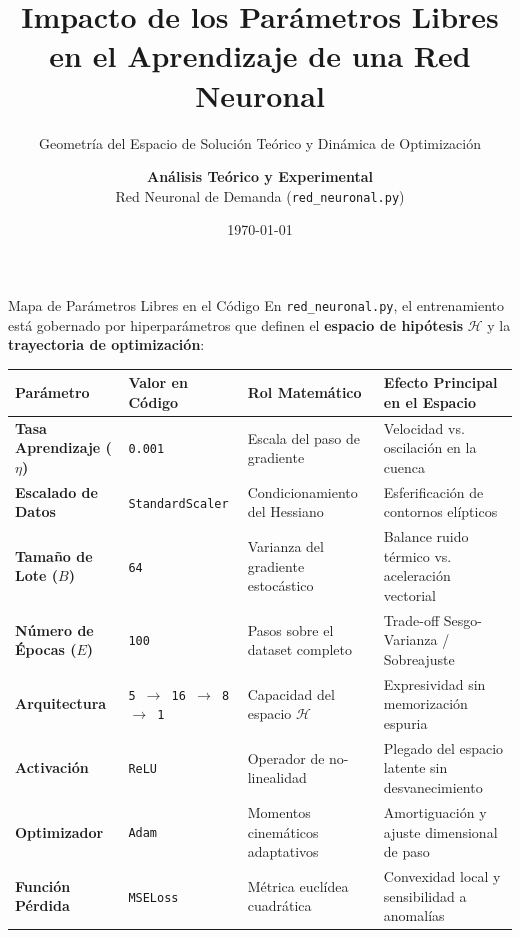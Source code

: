 \documentclass[10pt,aspectratio=169]{beamer}
\title{Impacto de los Parámetros Libres en el Aprendizaje de una Red Neuronal}
\subtitle{Geometría del Espacio de Solución Teórico y Dinámica de Optimización}
\author{\textbf{Análisis Teórico y Experimental} \\ Red Neuronal de Demanda (\texttt{red\_neuronal.py})}
\date{\today}
\institute{Deep Learning \& Optimización Matemática}
\begin{document}
\begin{frame}
  \titlepage
\end{frame}

\begin{frame}{Mapa de Parámetros Libres en el Código}
  En \texttt{red\_neuronal.py}, el entrenamiento está gobernado por hiperparámetros que definen el \textbf{espacio de hipótesis} $\mathcal{H}$ y la \textbf{trayectoria de optimización}:
  \vspace{0.15cm}

  \begin{center}
    \scriptsize
    \begin{tabular}{p{2.6cm} p{2.0cm} p{3.4cm} p{4.6cm}}
      \toprule
      \textbf{Parámetro} & \textbf{Valor en Código} & \textbf{Rol Matemático} & \textbf{Efecto Principal en el Espacio} \\
      \midrule
      \textbf{Tasa Aprendizaje ($\eta$)} & \texttt{0.001} & Escala del paso de gradiente & Velocidad vs. oscilación en la cuenca \\
      \textbf{Escalado de Datos} & \texttt{StandardScaler} & Condicionamiento del Hessiano & Esferificación de contornos elípticos \\
      \textbf{Tamaño de Lote ($B$)} & \texttt{64} & Varianza del gradiente estocástico & Balance ruido térmico vs. aceleración vectorial \\
      \textbf{Número de Épocas ($E$)} & \texttt{100} & Pasos sobre el dataset completo & Trade-off Sesgo-Varianza / Sobreajuste \\
      \textbf{Arquitectura} & \texttt{5 $\to$ 16 $\to$ 8 $\to$ 1} & Capacidad del espacio $\mathcal{H}$ & Expresividad sin memorización espuria \\
      \textbf{Activación} & \texttt{ReLU} & Operador de no-linealidad & Plegado del espacio latente sin desvanecimiento \\
      \textbf{Optimizador} & \texttt{Adam} & Momentos cinemáticos adaptativos & Amortiguación y ajuste dimensional de paso \\
      \textbf{Función Pérdida} & \texttt{MSELoss} & Métrica euclídea cuadrática & Convexidad local y sensibilidad a anomalías \\
      \bottomrule
    \end{tabular}
  \end{center}
\end{frame}
\end{document}
